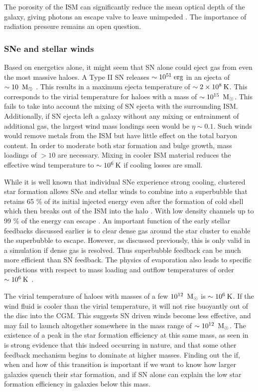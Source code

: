 The porosity of the ISM can significantly reduce the mean optical depth of the
galaxy, giving photons an escape valve to leave unimpeded \citep{Krumholz2013}.
The importance of radiation pressure remains an open question.

\subsubsection{SNe and stellar winds}
Based on energetics alone, it might seem that SN alone could eject gas from even
the most massive haloes.  A Type II SN releases $\sim10^{51}\;\rm{erg}$ in an
ejecta of $\sim10\;\>{\rm M_{\odot}}$ \citep{Leitherer1999}. This results in a maximum
ejecta temperature of $\sim2\times10^8\>{\rm K}$.  This corresponds to the virial
temperature for haloes with a mass of $\sim10^{15}\;\>{\rm M_{\odot}}$.  This fails to take
into account the mixing of SN ejecta with the surrounding ISM.   Additionally,
if SN ejecta left a galaxy without any mixing or entrainment of additional gas,
the largest wind mass loadings seen would be $\eta\sim0.1$.  Such winds would
remove metals from the ISM but have little effect on the total baryon content.
In order to moderate both star formation and bulge growth, mass loadings of
$>10$ are necessary.  Mixing in cooler ISM material reduces the effective wind
temperature to $\sim10^6\>{\rm K}$ if cooling losses are small.

While it is well known that individual SNe experience strong cooling,
clustered star formation allows SNe and stellar winds to combine into a
superbubble that retains 65 \% of its initial injected energy even after the
formation of cold shell which then breaks out of the ISM into the halo
\citep{MacLow1988}.  With low density channels up to 99 \% of the energy can
escape \citep{Rogers2013}.  An important function of the early stellar feedbacks
discussed earlier is to clear dense gas around the star cluster to enable the
superbubble to escape.  However, as discussed previously, this is only valid in
a simulation if dense gas is resolved.  Thus superbubble feedback can be much
more efficient than SN feedback.  The physics of evaporation also leads
to specific predictions with respect to mass loading and outflow temperatures
of order $\sim 10^6\>{\rm K}$ \citep{Keller2014}.

The virial temperature of haloes with masses of a few $10^{12}\;\>{\rm M_{\odot}}$ is
$\sim10^6\>{\rm K}$.  If the wind fluid is cooler than the virial temperature, it will
not rise buoyantly out of the disc into the CGM.  This suggests SN driven winds
become less effective, and may fail to launch altogether somewhere in the mass
range of $\sim10^{12}\;\>{\rm M_{\odot}}$. The existence of a peak in the star formation
efficiency at this same mass, as seen in \citet{Behroozi2013} is strong evidence
that this indeed occurring in nature, and that some other feedback mechanism
begins to dominate at higher masses.  Finding out the if, when and how of this
transition is important if we want to know how larger galaxies quench their star
formation, and if SN alone can explain the low star formation efficiency in
galaxies below this mass.

